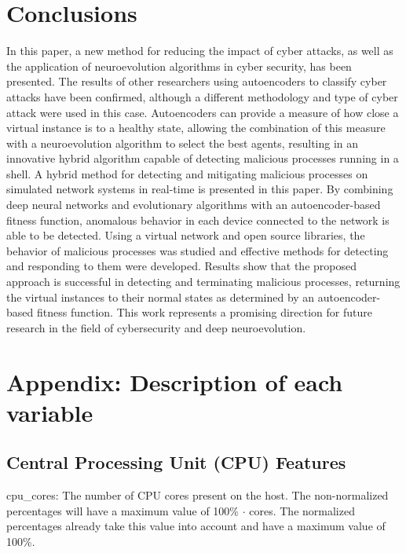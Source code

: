 \documentclass{iosart2c}
\begin{document}
\section{Conclusions}

In this paper, a new method for reducing the impact of cyber attacks, as well as the application of neuroevolution algorithms in cyber security, has been presented. The results of other researchers \cite{autoencoderdos, autoencoder1, autoencoder3} using autoencoders to classify cyber attacks have been confirmed, although a different methodology and type of cyber attack were used in this case. Autoencoders can provide a measure of how close a virtual instance is to a healthy state, allowing the combination of this measure with a neuroevolution algorithm to select the best agents, resulting in an innovative hybrid algorithm capable of detecting malicious processes running in a shell.
A hybrid method for detecting and mitigating malicious processes on simulated network systems in real-time is presented in this paper. By combining deep neural networks and evolutionary algorithms with an autoencoder-based fitness function, anomalous behavior in each device connected to the network is able to be detected. Using a virtual network and open source libraries, the behavior of malicious processes was studied and effective methods for detecting and responding to them were developed. Results show that the proposed approach is successful in detecting and terminating malicious processes, returning the virtual instances to their normal states as determined by an autoencoder-based fitness function. This work represents a promising direction for future research in the field of cybersecurity and deep neuroevolution.

\appendix
\section{Appendix: Description of each variable}\label{appx_variables}

\subsection{Central Processing Unit (CPU) Features}

cpu\_cores: The number of CPU cores present on the host. The non-normalized percentages will have a maximum value of 100\% $\cdot$ cores. The normalized percentages already take this value into account and have a maximum value of 100\%.\\
\end{document}
